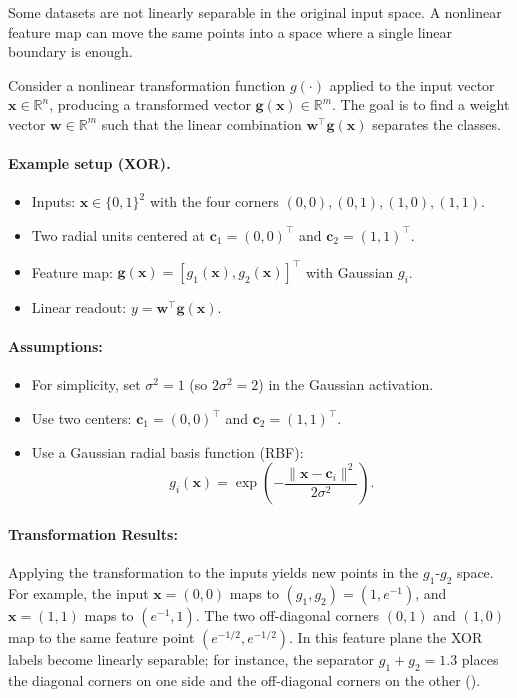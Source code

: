 Some datasets are not linearly separable in the original input space. A nonlinear feature map can move the same points into a space where a single linear boundary is enough.

Consider a nonlinear transformation function \( g(\cdot) \) applied to the input vector \( \mathbf{x} \in \mathbb{R}^n \), producing a transformed vector \( \mathbf{g}(\mathbf{x}) \in \mathbb{R}^m \). The goal is to find a weight vector \( \mathbf{w} \in \mathbb{R}^m \) such that the linear combination \( \mathbf{w}^\top \mathbf{g}(\mathbf{x}) \) separates the classes.

\paragraph{Example setup (XOR).}
\begin{itemize}
    \item Inputs: \(\mathbf{x}\in\{0,1\}^2\) with the four corners \((0,0),(0,1),(1,0),(1,1)\).
    \item Two radial units centered at \(\mathbf{c}_1=(0,0)^\top\) and \(\mathbf{c}_2=(1,1)^\top\).
    \item Feature map: \(\mathbf{g}(\mathbf{x})=[g_1(\mathbf{x}),g_2(\mathbf{x})]^\top\) with Gaussian \(g_i\).
    \item Linear readout: \(y = \mathbf{w}^\top \mathbf{g}(\mathbf{x})\).
\end{itemize}

\paragraph{Assumptions:}
\begin{itemize}
    \item For simplicity, set \(\sigma^2 = 1\) (so \(2\sigma^2 = 2\)) in the Gaussian activation.
    \item Use two centers: \(\mathbf{c}_1 = (0,0)^\top\) and \(\mathbf{c}_2 = (1,1)^\top\).
    \item Use a Gaussian radial basis function (RBF):
    \[
    g_i(\mathbf{x}) = \exp\left(-\frac{\|\mathbf{x} - \mathbf{c}_i\|^2}{2\sigma^2}\right).
    \]
\end{itemize}

\paragraph{Transformation Results:}
Applying the transformation to the inputs yields new points in the \(g_1\)-\(g_2\) space. For example, the input \(\mathbf{x}=(0,0)\) maps to \((g_1,g_2)=(1,e^{-1})\), and \(\mathbf{x}=(1,1)\) maps to \((e^{-1},1)\). The two off-diagonal corners \((0,1)\) and \((1,0)\) map to the same feature point \((e^{-1/2},e^{-1/2})\). In this feature plane the XOR labels become linearly separable; for instance, the separator \(g_1+g_2=1.3\) places the diagonal corners on one side and the off-diagonal corners on the other ().


